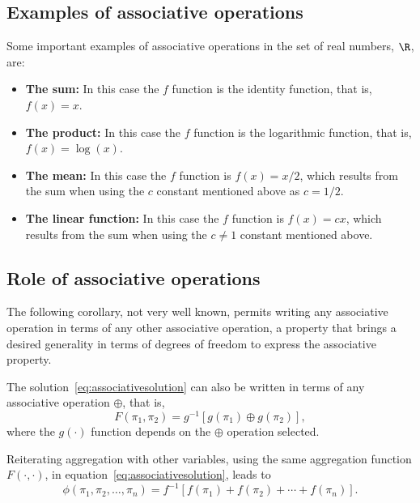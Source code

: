 \subsection{Examples of associative operations}
Some important examples of associative operations in the set of real numbers, $\R$, are:
\begin{itemize}
\item \textbf{The sum:} In this case the $f$ function is the identity function, that is, $f(x) = x$.
\item \textbf{The product:} In this case the $f$ function is the logarithmic function, that is, $f(x) = \log(x)$.
\item \textbf{The mean:} In this case the $f$ function is $f(x) = x/2$, which results from the sum when using the $c$ constant mentioned above as $c = 1/2$.
\item \textbf{The linear function:} In this case the $f$ function is $f(x) = cx$, which results from the sum when using the $c \neq 1$ constant mentioned above.
\end{itemize}

\subsection{Role of associative operations}
The following corollary, not very well known, permits writing any associative operation in terms of any other associative operation, a property that brings a desired generality in terms of degrees of freedom to express the associative property.

\begin{corollary}
\label{cor:associativegeneral}
The solution~\eqref{eq:associativesolution} can also be written in terms of any associative operation $\oplus$, that is,
\begin{equation}
F(\pi_1,\pi_2) = g^{-1}[g(\pi_1) \oplus g(\pi_2)],
\label{eq:generalassociative}
\end{equation}
where the $g(\cdot)$ function depends on the $\oplus$ operation selected.
\end{corollary}

Reiterating aggregation with other variables, using the same aggregation function $F(\cdot,\cdot)$, in equation~\eqref{eq:associativesolution}, leads to
\begin{equation}
\phi(\pi_1,\pi_2,\ldots,\pi_n) = f^{-1}[f(\pi_1) + f(\pi_2) + \cdots + f(\pi_n)].
\label{eq:n_variableassociative}
\end{equation}

